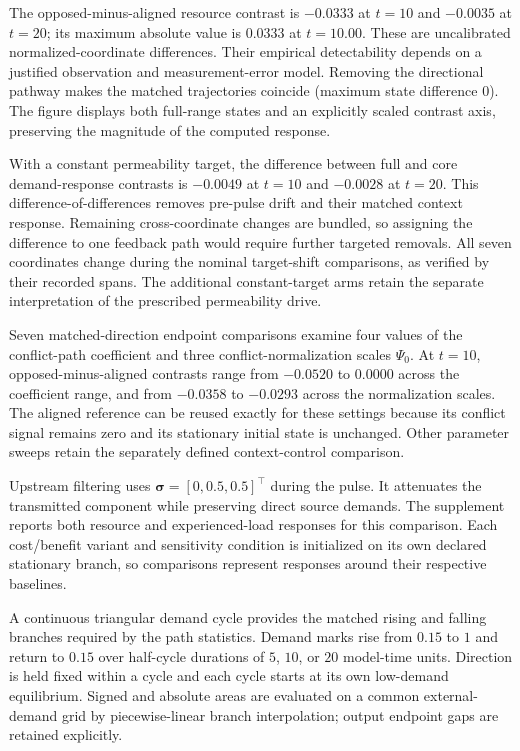 The opposed-minus-aligned resource contrast is $-0.0333$ at $t=10$ and $-0.0035$ at $t=20$; its maximum absolute value is $0.0333$ at $t=10.00$. These are uncalibrated normalized-coordinate differences. Their empirical detectability depends on a justified observation and measurement-error model. Removing the directional pathway makes the matched trajectories coincide (maximum state difference $0$). The figure displays both full-range states and an explicitly scaled contrast axis, preserving the magnitude of the computed response.

With a constant permeability target, the difference between full and core demand-response contrasts is $-0.0049$ at $t=10$ and $-0.0028$ at $t=20$. This difference-of-differences removes pre-pulse drift and their matched context response. Remaining cross-coordinate changes are bundled, so assigning the difference to one feedback path would require further targeted removals. All seven coordinates change during the nominal target-shift comparisons, as verified by their recorded spans. The additional constant-target arms retain the separate interpretation of the prescribed permeability drive.

Seven matched-direction endpoint comparisons examine four values of the conflict-path coefficient and three conflict-normalization scales $\Psi_0$. At $t=10$, opposed-minus-aligned contrasts range from $-0.0520$ to $0.0000$ across the coefficient range, and from $-0.0358$ to $-0.0293$ across the normalization scales. The aligned reference can be reused exactly for these settings because its conflict signal remains zero and its stationary initial state is unchanged. Other parameter sweeps retain the separately defined context-control comparison.

Upstream filtering uses $\bm\sigma=[0,0.5,0.5]^{\top}$ during the pulse. It attenuates the transmitted component while preserving direct source demands. The supplement reports both resource and experienced-load responses for this comparison. Each cost/benefit variant and sensitivity condition is initialized on its own declared stationary branch, so comparisons represent responses around their respective baselines.

A continuous triangular demand cycle provides the matched rising and falling branches required by the path statistics. Demand marks rise from $0.15$ to $1$ and return to $0.15$ over half-cycle durations of $5$, $10$, or $20$ model-time units. Direction is held fixed within a cycle and each cycle starts at its own low-demand equilibrium. Signed and absolute areas are evaluated on a common external-demand grid by piecewise-linear branch interpolation; output endpoint gaps are retained explicitly.

